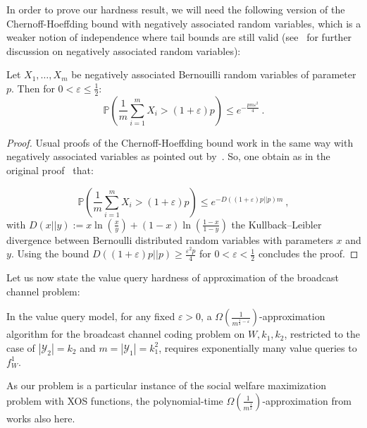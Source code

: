 In order to prove our hardness result, we will need the following version of the Chernoff-Hoeffding bound with negatively associated random variables, which is a weaker notion of independence where tail bounds are still valid (see~\cite{DR98} for further discussion on negatively associated random variables):
\begin{prop}
  \label{prop:chernoff}
  Let $X_1, \ldots, X_m$ be negatively associated Bernouilli random variables of parameter $p$. Then for $0 < \varepsilon \leq \frac{1}{2}$:
  \[ \mathbb{P}\left(\frac{1}{m}\sum_{i=1}^m X_i > (1+\varepsilon)p \right) \leq e^{-\frac{pm\varepsilon^2}{4}} \ . \]
\end{prop}
\begin{proof}
  Usual proofs of the Chernoff-Hoeffding bound work in the same way with negatively associated variables as pointed out by~\cite{DR98}. So, one obtain as in the original proof~\cite{Hoeffding63} that:

  \[ \mathbb{P}\left(\frac{1}{m}\sum_{i=1}^m X_i > (1+\varepsilon)p \right) \leq e^{-D\left((1+\varepsilon)p||p\right)m} \ ,\]
    with $D\left(x||y\right) := x\ln\left(\frac{x}{y}\right) + (1-x)\ln\left(\frac{1-x}{1-y}\right)$ the Kullback–Leibler divergence between Bernoulli distributed random variables with parameters $x$ and $y$. Using the bound $D\left((1+\varepsilon)p||p\right) \geq \frac{\varepsilon^2p}{4}$ for $0 < \varepsilon < \frac{1}{2}$ concludes the proof.
\end{proof}

Let us now state the value query hardness of approximation of the broadcast channel problem:
\begin{theo}
  \label{theo:VQhardnessBC}
  In the value query model, for any fixed $\varepsilon > 0$, a $\Omega\left(\frac{1}{m^{\frac{1}{2}-\varepsilon}}\right)$-approximation algorithm for the broadcast channel coding problem on $W,k_1,k_2$, restricted to the case of $|\mathcal{Y}_2| = k_2$ and $m = |\mathcal{Y}_1| = k_1^2$, requires exponentially many value queries to $f_W^1$.
\end{theo}

\begin{rk}
  As our problem is a particular instance of the social welfare maximization problem with \textrm{XOS} functions, the polynomial-time $\Omega\left(\frac{1}{m^{\frac{1}{2}}}\right)$-approximation from~\cite{DS06} works also here.
\end{rk}

